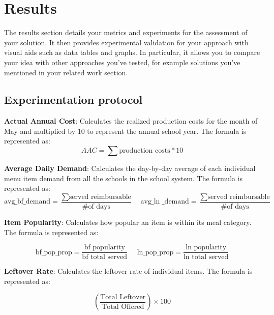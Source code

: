 \documentclass{scrartcl}
\begin{document}
\section{Results}

The results section details your metrics and experiments for the assessment of your solution. It then provides experimental validation for your approach with visual aids such as data tables and graphs. In particular, it allows you to compare your idea with other approaches you've tested, for example solutions you've mentioned in your related work section.

\subsection{Experimentation protocol}

\textbf{Actual Annual Cost}: Calculates the realized production costs for the month of May and multiplied by 10 to represent the annual school year. The formula is represented as:
\begin{equation}
    AAC = \sum \text{production costs} * 10
\end{equation}

\textbf{Average Daily Demand}: Calculates the day-by-day average of each individual menu item demand from all the schools in the school system. The formula is represented as:
\begin{equation}
    \text{avg\_bf\_demand} = \frac{\sum \text{served reimbursable}}{\text{\# of days}} \ \ \ \  \ \text{avg\_ln \_demand} = \frac{\sum \text{served reimbursable}}{\text{\# of days}}
\end{equation}

\textbf{Item Popularity}: Calculates how popular an item is within its meal category. The formula is represented as:

\begin{equation}
    \text{bf\_pop\_prop} = \frac{\text{bf popularity}}{\text{bf total served}} \ \ \ \ \ \ \text{ln\_pop\_prop} = \frac{\text{ln popularity}}{\text{ln total served}}
\end{equation}

\textbf{Leftover Rate}: Calculates the leftover rate of individual items. The formula is represented as:

\begin{equation}
    (\frac{\text{Total Leftover}}{\text{Total Offered}}) \times 100
\end{equation}
\end{document}

